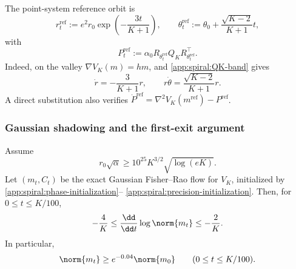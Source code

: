 The point-system reference orbit is
\begin{equation}
\label{app:spiral:reference-orbit}
    r_t^{\mathrm{ref}}
    :=e^2r_0\exp\left(-\frac{3t}{K+1}\right),
    \qquad
    \theta_t^{\mathrm{ref}}
    :=\theta_0+\frac{\sqrt{K-2}}{K+1}t,
\end{equation}
with
\[
    P_t^{\mathrm{ref}}
    :=\alpha_0R_{\theta_t^{\mathrm{ref}}}Q_K
      R_{\theta_t^{\mathrm{ref}}}^{\top}.
\]
Indeed, on the valley \(\nabla V_K(m)=hm\), and
\eqref{app:spiral:QK-band} gives
\[
    \dot r=-\frac3{K+1}r,
    \qquad
    r\dot\theta=\frac{\sqrt{K-2}}{K+1}r.
\]
A direct substitution also verifies
\(\dot P^{\mathrm{ref}}
=\nabla^2V_K(m^{\mathrm{ref}})-P^{\mathrm{ref}}\).

\subsubsection{Gaussian shadowing and the first-exit argument}

\begin{lemma}
\label{app:spiral:shadowing}
Assume
\begin{equation}
\label{app:spiral:radius-condition}
    r_0\sqrt\alpha
    \geq10^{25}K^{3/2}\sqrt{\log(eK)}.
\end{equation}
Let \((m_t,C_t)\) be the exact Gaussian Fisher--Rao flow for \(V_K\),
initialized by
\eqref{app:spiral:phase-initialization}--%
\eqref{app:spiral:precision-initialization}.  Then, for
\(0\leq t\leq K/100\),
\begin{equation}
\label{app:spiral:radial-shadowing}
    -\frac4K
    \leq\frac{\dd}{\dd t}\log\norm{m_t}
    \leq-\frac2K.
\end{equation}
In particular,
\begin{equation}
\label{app:spiral:mean-lower}
    \norm{m_t}\geq e^{-0.04}\norm{m_0}
    \qquad(0\leq t\leq K/100).
\end{equation}
\end{lemma}

